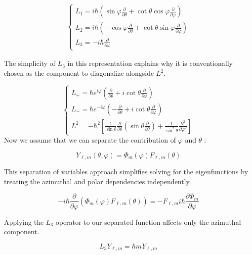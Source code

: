 \documentclass[italian]{HKNdocument}
\begin{document}
\begin{align}
\left\{\begin{array}{l}
L_{1} = i \hbar\left(\sin \varphi \frac{\partial}{\partial \theta}+\cot \theta \cos \varphi \frac{\partial}{\partial \varphi}\right)  \\
L_{2} = i \hbar\left(-\cos \varphi \frac{\partial}{\partial \theta}+\cot \theta \sin \varphi \frac{\partial}{\partial \varphi}\right) \\
L_{3} = -i \hbar \frac{\partial}{\partial \varphi}
\end{array}\right.
\end{align}

The simplicity of $L_3$ in this representation explains why it is conventionally chosen as the component to diagonalize alongside $L^2$.

\[
\left\{\begin{array}{l}
L_{+}=\hbar e^{i \varphi}\left(\frac{\partial}{\partial \theta}+i \cot \theta \frac{\partial}{\partial \varphi}\right)  \\
L_{-}=\hbar e^{-i \varphi}\left(-\frac{\partial}{\partial \theta}+i \cot \theta \frac{\partial}{\partial \varphi}\right) \\
L^{2}=-\hbar^{2}\left[\frac{1}{\sin \theta} \frac{\partial}{\partial \theta}\left(\sin \theta \frac{\partial}{\partial \theta}\right)+\frac{1}{\sin ^{2} \theta} \frac{\partial^{2}}{\partial \varphi^{2}}\right]
\end{array}\right.
\]
Now we assume that we can separate the contribution of $\varphi$ and $\theta$ :

\begin{equation}
Y_{\ell, m}(\theta, \varphi)=\Phi_{m}(\varphi) F_{\ell, m}(\theta)
\end{equation}

This separation of variables approach simplifies solving for the eigenfunctions by treating the azimuthal and polar dependencies independently.

\begin{equation}
-i \hbar \frac{\partial}{\partial \varphi}\left(\Phi_{m}(\varphi) F_{\ell, m}(\theta)\right)=-F_{\ell, m} i \hbar \frac{\partial \Phi_{m}}{\partial \varphi}
\end{equation}

Applying the $L_3$ operator to our separated function affects only the azimuthal component.

\begin{equation}
L_{3} Y_{\ell, m}=\hbar m Y_{\ell, m}
\end{equation}
\end{document}

